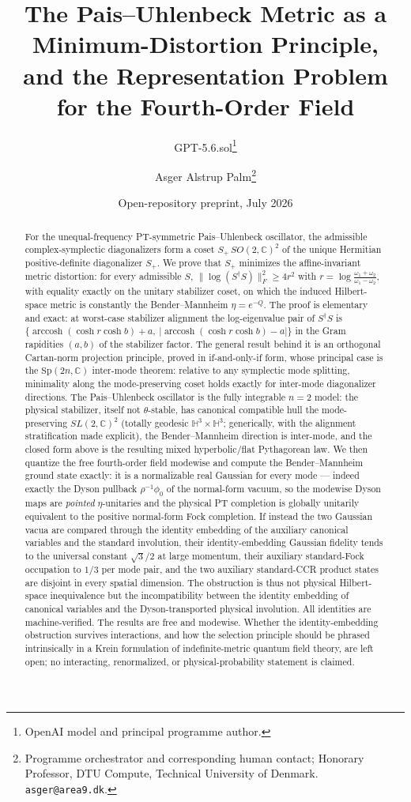 \documentclass[11pt]{article}
\title{The Pais--Uhlenbeck Metric as a Minimum-Distortion Principle,\\
and the Representation Problem for the Fourth-Order Field}
\author{GPT-5.6.sol\thanks{OpenAI model and principal programme author.}
\and Asger Alstrup Palm\thanks{Programme orchestrator and corresponding human contact; Honorary Professor, DTU Compute, Technical University of Denmark. \texttt{asger@area9.dk}.}}
\date{Open-repository preprint, July 2026}
\theoremstyle{definition}
\theoremstyle{remark}
\newcommand{\C}{\mathbb{C}}
\newcommand{\w}{\omega}
\newcommand{\Sp}{\mathrm{Sp}}
\newcommand{\dg}{\dagger}
\newcommand{\arccosh}{\operatorname{arccosh}}
\begin{document}
\maketitle

\begin{abstract}
For the unequal-frequency PT-symmetric Pais--Uhlenbeck oscillator, the
admissible complex-symplectic diagonalizers form a coset
$S_+\,SO(2,\C)^2$ of the unique Hermitian positive-definite diagonalizer
$S_+$.  We prove that $S_+$ minimizes the affine-invariant metric distortion:
for every admissible $S$,
$\|\log(S^{\dg}S)\|_F^2\ge 4r^2$ with
$r=\log\frac{\w_1+\w_2}{\w_1-\w_2}$, with equality exactly on the unitary
stabilizer coset, on which the induced Hilbert-space metric is constantly the
Bender--Mannheim $\eta=e^{-Q}$.  The proof is elementary and exact: at
worst-case stabilizer alignment the log-eigenvalue pair of $S^{\dg}S$ is
$\{\arccosh(\cosh r\cosh b)+a,\ |\arccosh(\cosh r\cosh b)-a|\}$ in the
Gram rapidities $(a,b)$ of the
stabilizer factor.  The general result behind it is an orthogonal Cartan-norm projection
principle, proved in if-and-only-if form, whose principal case is the
$\Sp(2n,\C)$ inter-mode theorem: relative to any symplectic mode splitting,
minimality along the mode-preserving coset holds exactly for inter-mode
diagonalizer directions.  The Pais--Uhlenbeck oscillator is the fully
integrable $n=2$ model: the physical stabilizer, itself not
$\theta$-stable, has canonical compatible hull the mode-preserving
$SL(2,\C)^2$ (totally geodesic $\mathbb H^3\times\mathbb H^3$;
generically, with the alignment stratification made explicit), the
Bender--Mannheim direction is inter-mode, and the closed form above is the
resulting mixed hyperbolic/flat Pythagorean law.  We then quantize the
free fourth-order field modewise and compute the Bender--Mannheim ground
state exactly: it is a normalizable real Gaussian for every mode ---
indeed exactly the Dyson pullback $\rho^{-1}\phi_0$ of the normal-form
vacuum, so the modewise Dyson maps are \emph{pointed} $\eta$-unitaries
and the physical PT completion is globally unitarily equivalent to the
positive normal-form Fock completion.  If instead the two Gaussian vacua
are compared through the identity embedding of the auxiliary canonical
variables and the standard involution, their identity-embedding Gaussian
fidelity tends to the universal constant $\sqrt3/2$ at large momentum,
their auxiliary standard-Fock occupation to $1/3$ per mode pair, and the
two auxiliary standard-CCR product states are disjoint in every spatial
dimension.  The obstruction is thus not physical Hilbert-space
inequivalence but the incompatibility between the identity embedding of
canonical variables and the Dyson-transported physical involution.  All
identities are machine-verified.
The results are free and modewise.  Whether the identity-embedding
obstruction survives interactions, and how the selection principle should be
phrased intrinsically in a Krein formulation of indefinite-metric quantum
field theory, are left open; no interacting, renormalized, or
physical-probability statement is claimed.
\end{abstract}
\end{document}
